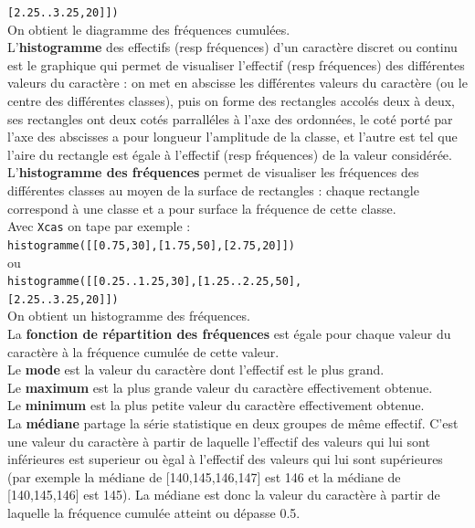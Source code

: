 \documentclass[a4paper,11pt]{book}
\begin{document}
{\tt [2.25..3.25,20]])}\\
On obtient le diagramme des fr\'equences cumul\'ees.\\
L'{\bf histogramme} des effectifs (resp fr\'equences) d'un caract\`ere discret 
ou continu est le graphique qui permet de visualiser l'effectif (resp 
fr\'equences) des diff\'erentes valeurs du caract\`ere : on met en abscisse les
diff\'erentes valeurs  du caract\`ere (ou le centre des diff\'erentes classes),
puis on forme des rectangles accol\'es deux \`a deux, ses  rectangles ont deux 
cot\'es parrall\'eles \`a l'axe des ordonn\'ees,
le  cot\'e port\'e par l'axe des abscisses a pour longueur l'amplitude de la 
classe, et l'autre est  tel que l'aire du rectangle est \'egale \`a l'effectif 
(resp fr\'equences) de la valeur consid\'er\'ee.\\  
L'{\bf histogramme des fr\'equences} permet de visualiser les fr\'equences des 
diff\'erentes classes au moyen de la surface de rectangles : chaque rectangle 
correspond \`a une classe et a  pour surface la fr\'equence de cette classe.\\
Avec {\tt Xcas} on tape par exemple :\\
{\tt histogramme([[0.75,30],[1.75,50],[2.75,20]])}\\
ou \\
{\tt histogramme([[0.25..1.25,30],[1.25..2.25,50],}\\
{\tt [2.25..3.25,20]])}\\
On obtient un histogramme des fr\'equences.\\  
La {\bf fonction de r\'epartition des fr\'equences} est \'egale pour chaque 
valeur du caract\`ere \`a la fr\'equence cumul\'ee de cette valeur.\\
Le {\bf mode} est la valeur du caract\`ere dont l'effectif est le plus grand.\\
Le {\bf maximum} est la plus grande valeur du caract\`ere effectivement 
obtenue.\\
Le {\bf minimum} est la plus petite valeur du caract\`ere effectivement 
obtenue.\\
La {\bf m\'ediane}  partage la s\'erie statistique en deux groupes de m\^eme 
effectif. C'est une valeur du caract\`ere \`a partir de laquelle
 l'effectif des valeurs qui lui sont inf\'erieures est superieur ou \`egal \`a 
l'effectif des valeurs qui lui sont sup\'erieures (par exemple
la m\'ediane de [140,145,146,147] est 146 et la m\'ediane de [140,145,146] est 
145). La m\'ediane est donc la valeur du caract\`ere \`a partir de laquelle la 
fr\'equence cumul\'ee atteint ou d\'epasse 0.5.\\
\end{document}
